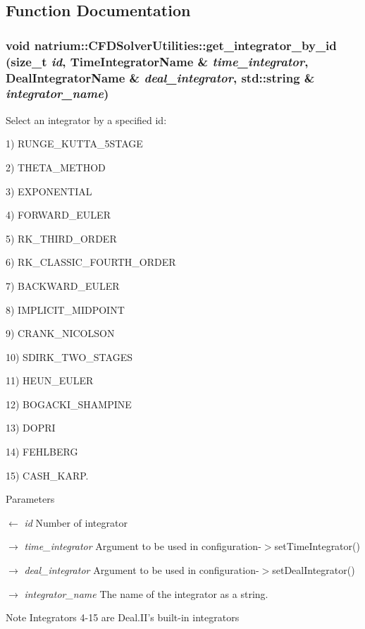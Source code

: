 \subsection{Function Documentation}
\hypertarget{namespacenatrium_1_1CFDSolverUtilities_a3719826384e1c13644bac00524f72a46}{
\subsubsection[{get\_\-integrator\_\-by\_\-id}]{\setlength{\rightskip}{0pt plus 5cm}void natrium::CFDSolverUtilities::get\_\-integrator\_\-by\_\-id (size\_\-t {\em id}, \/  TimeIntegratorName \& {\em time\_\-integrator}, \/  DealIntegratorName \& {\em deal\_\-integrator}, \/  std::string \& {\em integrator\_\-name})}}
\label{namespacenatrium_1_1CFDSolverUtilities_a3719826384e1c13644bac00524f72a46}


Select an integrator by a specified id:
\begin{DoxyItemize}
\item 1) RUNGE\_\-KUTTA\_\-5STAGE
\item 2) THETA\_\-METHOD
\item 3) EXPONENTIAL
\item 4) FORWARD\_\-EULER
\item 5) RK\_\-THIRD\_\-ORDER
\item 6) RK\_\-CLASSIC\_\-FOURTH\_\-ORDER
\item 7) BACKWARD\_\-EULER
\item 8) IMPLICIT\_\-MIDPOINT
\item 9) CRANK\_\-NICOLSON
\item 10) SDIRK\_\-TWO\_\-STAGES
\item 11) HEUN\_\-EULER
\item 12) BOGACKI\_\-SHAMPINE
\item 13) DOPRI
\item 14) FEHLBERG
\item 15) CASH\_\-KARP. 
\end{DoxyItemize}
\begin{DoxyParams}{Parameters}
\item[\mbox{$\leftarrow$} {\em id}]Number of integrator \item[\mbox{$\rightarrow$} {\em time\_\-integrator}]Argument to be used in configuration-\/$>$setTimeIntegrator() \item[\mbox{$\rightarrow$} {\em deal\_\-integrator}]Argument to be used in configuration-\/$>$setDealIntegrator() \item[\mbox{$\rightarrow$} {\em integrator\_\-name}]The name of the integrator as a string. \end{DoxyParams}
\begin{DoxyNote}{Note}
Integrators 4-\/15 are Deal.II's built-\/in integrators 
\end{DoxyNote}
